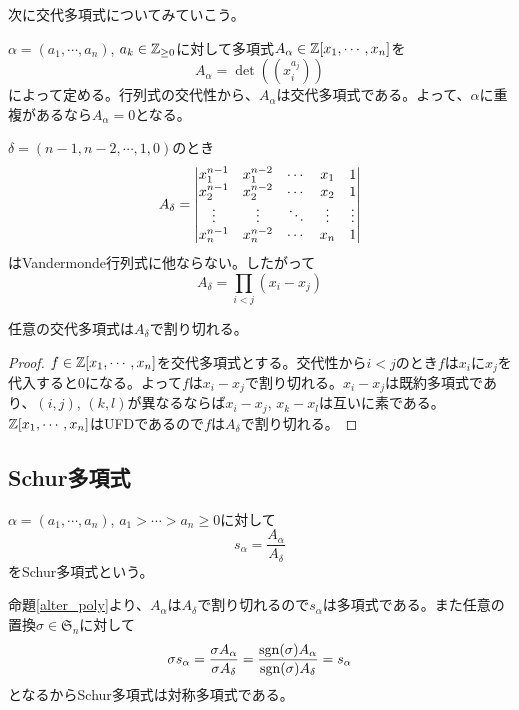 \documentclass{ltjsreport}
\begin{document}
次に交代多項式についてみていこう。


\begin{defin}
    $\alpha=(a_1,\cdots,a_n)$, $a_k\in\mathbb{Z}_{\geq 0}$に対して多項式$A_\alpha\in\mathbb{Z}[x_1,\cdots,x_n]$を
    \[
        A_\alpha=\det((x_i^{a_j}))
    \]
    によって定める。行列式の交代性から、$A_\alpha$は交代多項式である。よって、$\alpha$に重複があるなら$A_\alpha=0$となる。
\end{defin}

\begin{eg}
    $\delta=(n-1,n-2,\cdots,1,0)$のとき
    \[
        A_\delta=\begin{vmatrix} x_1^{n-1}&x_1^{n-2}&\cdots&x_1&1\\
                       x_2^{n-1}&x_2^{n-2}&\cdots&x_2&1\\
                       \vdots&\vdots&\ddots&\vdots&\vdots\\
                       x_n^{n-1}&x_n^{n-2}&\cdots&x_n&1 \end{vmatrix}
    \]
    はVandermonde行列式に他ならない。したがって
    \[
    A_\delta=\prod_{i<j}(x_i-x_j)    
    \]
\end{eg}

\begin{prop}\label{alter_poly}
    任意の交代多項式は$A_\delta$で割り切れる。
\end{prop}

\begin{proof}
    $f\in\mathbb{Z}[x_1,\cdots,x_n]$を交代多項式とする。交代性から$i<j$のとき$f$は$x_i$に$x_j$を代入すると$0$になる。よって$f$は$x_i-x_j$で割り切れる。$x_i-x_j$は既約多項式であり、$(i,j)$, $(k,l)$が異なるならば$x_i-x_j$, $x_k-x_l$は互いに素である。$\mathbb{Z}[x_1,\cdots,x_n]$はUFDであるので$f$は$A_\delta$で割り切れる。
\end{proof}


\subsection{Schur多項式}

\begin{defin}[Schur多項式]
    $\alpha=(a_1,\cdots,a_n)$, $a_1>\cdots> a_n\geq 0$に対して
    \[
    s_\alpha=\frac{A_\alpha}{A_\delta}  
    \]
    をSchur多項式という。
\end{defin}


命題\ref{alter_poly}より、$A_\alpha$は$A_\delta$で割り切れるので$s_\alpha$は多項式である。また任意の置換$\sigma\in\mathfrak{S}_n$に対して
\[
    \sigma s_\alpha=\frac{\sigma A_\alpha}{\sigma A_\delta}=\frac{\mathrm{sgn} (\sigma)A_\alpha}{\mathrm{sgn} (\sigma)A_\delta}=s_\alpha    
\]
となるからSchur多項式は対称多項式である。
\end{document}
